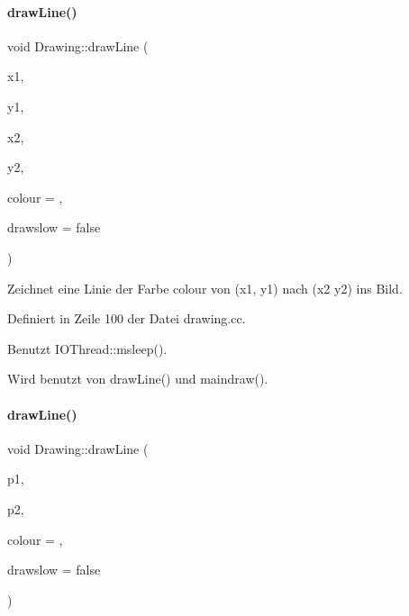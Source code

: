 \paragraph{\texorpdfstring{draw\+Line()}{drawLine()}\hspace{0.1cm}{\footnotesize\ttfamily [1/2]}}
{\footnotesize\ttfamily void Drawing\+::draw\+Line (\begin{DoxyParamCaption}\item[{int}]{x1,  }\item[{int}]{y1,  }\item[{int}]{x2,  }\item[{int}]{y2,  }\item[{\mbox{\hyperlink{classDrawColour}{Draw\+Colour}}}]{colour = {},  }\item[{bool}]{drawslow = {\ttfamily false} }\end{DoxyParamCaption})}



Zeichnet eine Linie der Farbe {\ttfamily colour} von ({\ttfamily x1}, {\ttfamily y1}) nach ({\ttfamily x2} {\ttfamily y2}) ins Bild. 



Definiert in Zeile 100 der Datei drawing.\+cc.



Benutzt I\+O\+Thread\+::msleep().



Wird benutzt von draw\+Line() und maindraw().

\mbox{\label{classDrawing_aee26a121d00e5ba0317c4280cb07e3bf}} 
\paragraph{\texorpdfstring{draw\+Line()}{drawLine()}\hspace{0.1cm}{\footnotesize\ttfamily [2/2]}}
{\footnotesize\ttfamily void Drawing\+::draw\+Line (\begin{DoxyParamCaption}\item[{\mbox{\hyperlink{point2d_8h_aeeeb57e4186edb0a4274b64925e0d0fb}{I\+Point2D}}}]{p1,  }\item[{\mbox{\hyperlink{point2d_8h_aeeeb57e4186edb0a4274b64925e0d0fb}{I\+Point2D}}}]{p2,  }\item[{\mbox{\hyperlink{classDrawColour}{Draw\+Colour}}}]{colour = {},  }\item[{bool}]{drawslow = {\ttfamily false} }\end{DoxyParamCaption})\hspace{0.3cm}{\ttfamily [inline]}}



